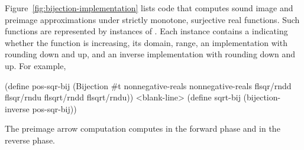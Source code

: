 Figure~\ref{fig:bijection-implementation} lists code that computes sound image and preimage approximations under strictly monotone, surjective real functions.
Such functions are represented by instances of .
Each instance contains a  indicating whether the function is increasing, its domain, range, an implementation with rounding down and up, and an inverse implementation with rounding down and up.
For example,
\begin{center}\singlespacing
\begin{schemedisplay}
(define pos-sqr-bij
  (Bijection #t nonnegative-reals nonnegative-reals
             flsqr/rndd flsqr/rndu
             flsqrt/rndd flsqrt/rndu))
<blank-line>
(define sqrt-bij
  (bijection-inverse pos-sqr-bij))
\end{schemedisplay}
\end{center}
The preimage arrow computation  computes  in the forward phase and  in the reverse phase.

